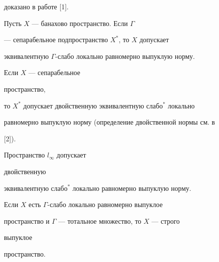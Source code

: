 доказано в работе [1]. 


 


\begin{thm} Пусть $X$ --- банахово пространство. Если $\Gamma$ 


--- сепарабельное подпространство $X^*$, то $X$ допускает  


эквивалентную $\Gamma$-слабо локально равномерно выпуклую норму. 


\end{thm} 


 


\begin{cor}[{\myfont{}[1]}] Если $X$ --- сепарабельное 


пространство, 


то $X^*$ допускает двойственную эквивалентную слабо${}^*$ локально 


равномерно выпуклую норму (определение двойственной нормы см. в 


[2]). 


\end{cor} 


 


\begin{cor}[{\myfont{}[1]}] Пространство $l_\infty$ допускает 


двойственную 


эквивалентную слабо${}^*$ локально равномерно выпуклую норму. 


\end{cor} 


 


\begin{thm} Если $X$ есть $\Gamma$-слабо локально равномерно выпуклое 


пространство и $\Gamma$ --- тотальное множество, то $X$ --- строго 


выпуклое 


пространство. 


\end{thm} 


 


